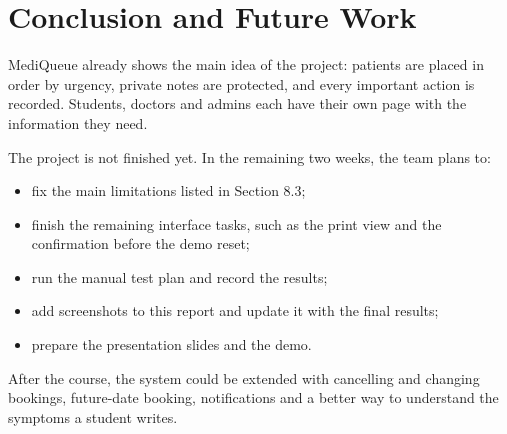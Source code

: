 \documentclass[12pt,a4paper]{article}
\begin{document}
\section{Conclusion and Future Work}
MediQueue already shows the main idea of the project: patients are placed in order by urgency, private notes are protected, and every important action is recorded. Students, doctors and admins each have their own page with the information they need.

The project is not finished yet. In the remaining two weeks, the team plans to:
\begin{itemize}
  \item fix the main limitations listed in Section 8.3;
  \item finish the remaining interface tasks, such as the print view and the confirmation before the demo reset;
  \item run the manual test plan and record the results;
  \item add screenshots to this report and update it with the final results;
  \item prepare the presentation slides and the demo.
\end{itemize}
After the course, the system could be extended with cancelling and changing bookings, future-date booking, notifications and a better way to understand the symptoms a student writes.
\end{document}
